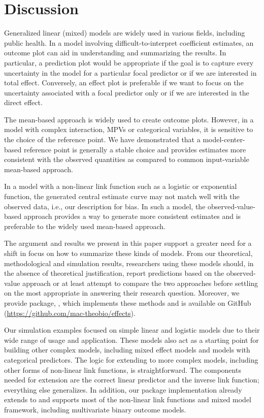 \section{Discussion}

Generalized linear (mixed) models are widely used in various fields, including public health. In a model involving difficult-to-interpret coefficient estimates, an outcome plot can aid in understanding and summarizing the results. In particular, a prediction plot would be appropriate if the goal is to capture every uncertainty in the model for a particular focal predictor or if we are interested in total effect. Conversely, an effect plot is preferable if we want to focus on the uncertainty associated with a focal predictor only or if we are interested in the direct effect.

The mean-based approach is widely used to create outcome plots. However, in a model with complex interaction, MPVs or categorical variables, it is sensitive to the choice of the reference point. We have demonstrated that a model-center-based reference point is generally a stable choice and provides estimates more consistent with the observed quantities as compared to common input-variable mean-based approach.

In a model with a non-linear link function such as a logistic or exponential function, the generated central estimate curve may not match well with the observed data, i.e., our description for bias. In such a model, the observed-value-based approach provides a way to generate more consistent estimates and is preferable to the widely used mean-based approach.

The argument and results we present in this paper support a greater need for a shift in focus on how to summarize these kinds of models. From our theoretical, methodological and simulation results, researchers using these models should, in the absence of theoretical justification, report predictions based on the observed-value approach or at least attempt to compare the two approaches before settling on the most appropriate in answering their research question. Moreover, we provide  package, , which implements these methods and is available on GitHub (\href{https://github.com/mac-theobio/effects}{https://github.com/mac-theobio/effects}).

Our simulation examples focused on simple linear and logistic models due to their wide range of usage and application. These models also act as a starting point for building other complex models, including mixed effect models and models with categorical predictors. The logic for extending to more complex models, including other forms of non-linear link functions, is straightforward. The components needed for extension are the correct linear predictor and the inverse link function; everything else generalizes. In addition, our  package implementation already extends to and supports most of the non-linear link functions and mixed model framework, including multivariate binary outcome models.

